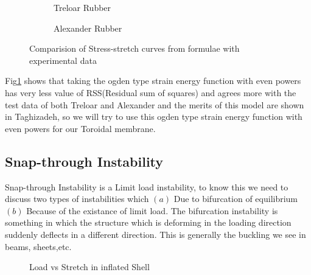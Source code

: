 \documentclass[12pt]{report}
\begin{document}
\vspace{-5mm}

\begin{figure}
	\centering
	\begin{subfigure}{0.45\textwidth}
			\centering
			\caption{Treloar Rubber}
		\end{subfigure}
		\begin{subfigure}{0.45\textwidth}
			\centering
			\caption{Alexander Rubber}
		\end{subfigure}
	\caption{Comparision of Stress-stretch curves from formulae with experimental data}
	\centering
	\label{Fig1.1}
\end{figure}

 Fig\ref{Fig1.1} shows that taking the ogden type strain energy function with even powers has very less value of RSS(Residual sum of squares) and agrees more with the test data of both Treloar\cite{treloar} and Alexander\cite{alexander} and the merits of this model are shown in Taghizadeh\cite{snap}, so we will try to use this ogden type strain energy function with even powers for our Toroidal membrane.

\subsection{Snap-through Instability}
Snap-through Instability is a Limit load instability, to know this we need to discuss two types of instabilities which $(a)$ Due to bifurcation of equilibrium $(b)$ Because of the existance of limit load. The bifurcation instability is something in which the structure which is deforming in the loading direction suddenly deflects in a different direction. This is generally the buckling we see in beams, sheets,etc.

\begin{figure}
    \centering
    \caption{Load vs Stretch in inflated Shell\cite{snap}}
    \label{Fig1.2}
\end{figure}
\end{document}
